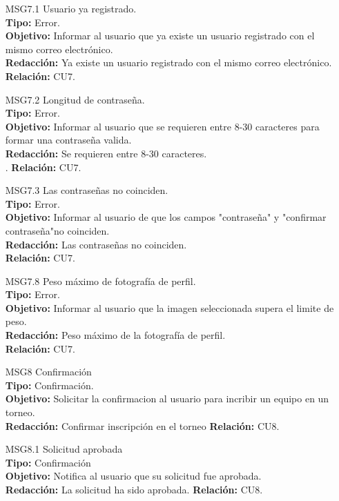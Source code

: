 \begin{itemize}
	 \item[MSG7.1] Usuario ya registrado.\\
	 \textbf{Tipo:} Error.\\
	 \textbf{Objetivo:} Informar al usuario que ya existe un usuario registrado con el mismo correo electrónico.\\
	 \textbf{Redacción:} Ya existe un usuario registrado con el mismo correo electrónico.
	 \textbf{Relación:} CU7.
	 
	 \item[MSG7.2] Longitud de contraseña.\\
	 \textbf{Tipo:} Error.\\
	 \textbf{Objetivo:} Informar al usuario que se requieren entre 8-30 caracteres para formar una contraseña valida.\\
	 \textbf{Redacción:} Se requieren entre 8-30 caracteres.\\.
	 \textbf{Relación:} CU7.
	 
	\item[MSG7.3] Las contraseñas no coinciden.\\
	\textbf{Tipo:} Error.\\
	\textbf{Objetivo:} Informar al usuario de que los campos "contraseña" y "confirmar contraseña"no coinciden.\\
	\textbf{Redacción:} Las contraseñas no coinciden.\\
	\textbf{Relación:} CU7.
	
	 \item[MSG7.8] Peso máximo de fotografía de perfil.\\
	 \textbf{Tipo:} Error.\\
	 \textbf{Objetivo:} Informar al usuario que la imagen seleccionada supera el limite de peso.\\
	 \textbf{Redacción:} Peso máximo de la fotografía de perfil. \\	 
	 \textbf{Relación:} CU7.
	 
	 \item[MSG8] Confirmación\\
	 \textbf{Tipo:} Confirmación.\\
	 \textbf{Objetivo:} Solicitar la confirmacion al usuario para incribir un equipo en un torneo.\\
	 \textbf{Redacción:} Confirmar inscripción en el torneo
	 \textbf{Relación:} CU8.
	 
	 \item[MSG8.1] Solicitud aprobada\\
	 \textbf{Tipo:} Confirmación\\
	 \textbf{Objetivo:} Notifica al usuario que su solicitud fue aprobada.\\
	 \textbf{Redacción:} La solicitud ha sido aprobada.
	 \textbf{Relación:} CU8.
	 

\end{itemize}
